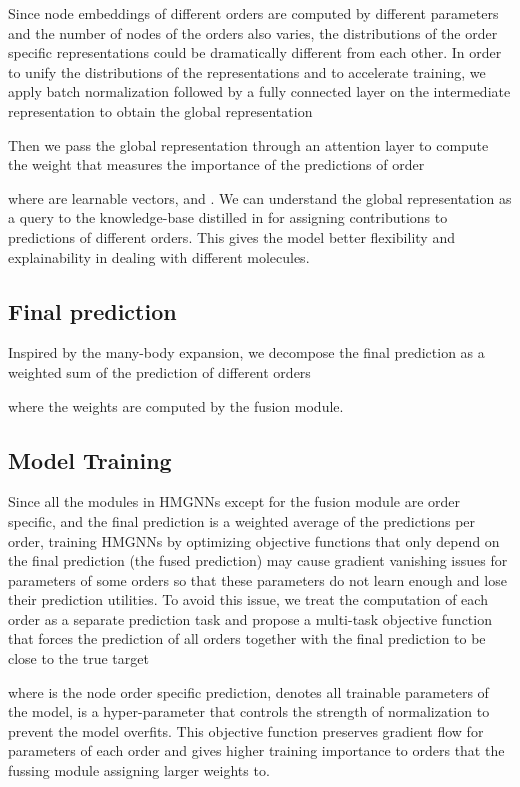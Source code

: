 \documentclass[conference]{IEEEtran}
\begin{document}
Since node embeddings of different orders are computed by different parameters and the number of nodes of the orders also varies, the distributions of the order specific representations could be dramatically different from each other. In order to unify the distributions of the representations and to accelerate training, we apply batch normalization \cite{batchnorm} followed by a fully connected layer on the intermediate representation to obtain the global representation

Then we pass the global representation through an attention layer to compute the weight  that measures the importance of the predictions of order 

where  are learnable vectors, and . We can understand the global representation as a query to the knowledge-base distilled in  for assigning contributions to predictions of different orders. This gives the model better flexibility and explainability in dealing with different molecules.

\subsection{Final prediction}

Inspired by the many-body expansion, we decompose the final prediction as a weighted sum of the prediction of different orders

where the weights  are computed by the fusion module.

\subsection{Model Training}

Since all the modules in HMGNNs except for the fusion module are order specific, and the final prediction is a weighted average of the predictions per order, training HMGNNs by optimizing objective functions that only depend on the final prediction (the fused prediction) may cause gradient vanishing issues for parameters of some orders so that these parameters do not learn enough and lose their prediction utilities. To avoid this issue, we treat the computation of each order as a separate prediction task and propose a multi-task objective function that forces the prediction of all orders together with the final prediction to be close to the true target

where  is the node order specific prediction,  denotes all trainable parameters of the model,  is a hyper-parameter that controls the strength of  normalization to prevent the model overfits. This objective function preserves gradient flow for parameters of each order and gives higher training importance to orders that the fussing module assigning larger weights to.
\end{document}
